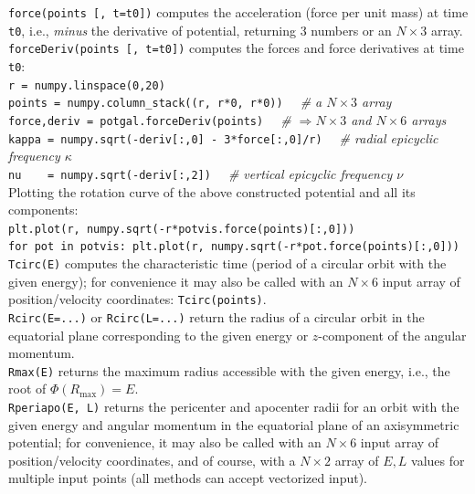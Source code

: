 \documentclass[12pt]{article}
\begin{document}
\texttt{force(points [, t=t0])} computes the acceleration (force per unit mass) at time \texttt{t0}, i.e., \textit{minus} the derivative of potential, returning 3 numbers or an $N\times3$ array.\\[2mm]
\texttt{forceDeriv(points [, t=t0])} computes the forces and force derivatives at time \texttt{t0}:\\[1mm]
\texttt{r = numpy.linspace(0,20)}\\
\texttt{points = numpy.column_stack((r, r*0, r*0))}
\textit{\color{Sepia} \ \ \# a $N\times3$ array}\\
\texttt{force,deriv = potgal.forceDeriv(points)}
\textit{\color{Sepia} \ \ \# $\Rightarrow N\times3$ and $N\times6$ arrays} \\
\texttt{kappa = numpy.sqrt(-deriv[:,0] - 3*force[:,0]/r)}
\textit{\color{Sepia} \ \ \# radial epicyclic frequency $\kappa$} \\
\texttt{nu~~~~= numpy.sqrt(-deriv[:,2])}
\textit{\color{Sepia} \ \ \# vertical epicyclic frequency $\nu$} \\[1mm]
Plotting the rotation curve of the above constructed potential and all its components:\\
\texttt{plt.plot(r, numpy.sqrt(-r*potvis.force(points)[:,0]))}\\
\texttt{for pot in potvis: plt.plot(r, numpy.sqrt(-r*pot.force(points)[:,0]))}\\[2mm]
\texttt{Tcirc(E)} computes the characteristic time (period of a circular orbit with the given energy); for convenience it may also be called with an $N\times6$ input array of position/velocity coordinates: \texttt{Tcirc(points)}.\\[2mm]
\texttt{Rcirc(E=...)} or \texttt{Rcirc(L=...)} return the radius of a circular orbit in the equatorial plane corresponding to the given energy or $z$-component of the angular momentum.\\[2mm]
\texttt{Rmax(E)} returns the maximum radius accessible with the given energy, i.e., the root of $\Phi(R_\mathrm{max})=E$.\\[2mm]
\texttt{Rperiapo(E, L)} returns the pericenter and apocenter radii for an orbit with the given energy and angular momentum in the equatorial plane of an axisymmetric potential; for convenience, it may also be called with an $N\times6$ input array of position/velocity coordinates, and of course, with a $N\times2$ array of $E,L$ values for multiple input points (all methods can accept vectorized input).
\end{document}
